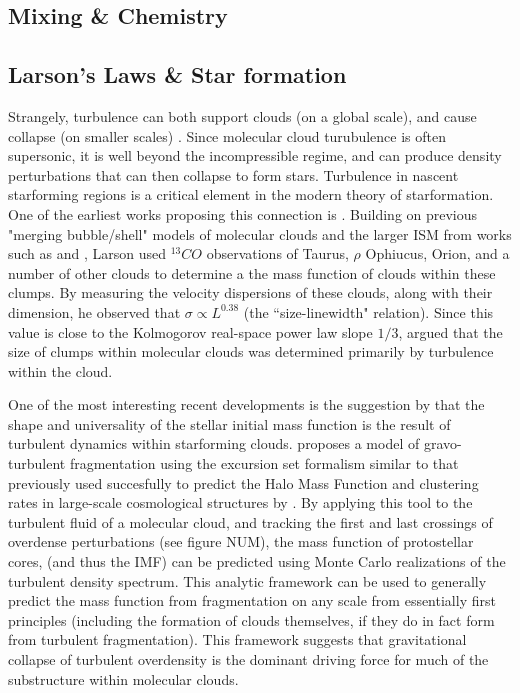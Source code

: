 \documentclass[12pt, preprint]{aastex}
\begin{document}
\subsection{Mixing \& Chemistry}
\subsection{Larson's Laws \& Star formation}
Strangely, turbulence can both support clouds (on a global scale), and cause
collapse (on smaller scales) \citep{mac2004}.  Since molecular cloud
turubulence is often supersonic, it is well beyond the incompressible regime,
and can produce density perturbations that can then collapse to form
stars\citep{elm2004}. Turbulence in nascent starforming 
regions is a critical element in the modern theory 
of starformation. One of the earliest works proposing this connection is
\citet{larson1981}.  Building on previous "merging bubble/shell" models of
molecular clouds and the larger ISM from works such as \citet{norman1980} and
\citet{mckee1977}, Larson used $^{13}CO$ observations of Taurus, $\rho$
Ophiucus, Orion, and a number of other clouds to determine a the mass function
of clouds within these clumps.  By measuring the velocity dispersions of these
clouds, along with their dimension, he observed that $\sigma \propto L^{0.38}$
(the ``size-linewidth" relation).  Since this value is close to the Kolmogorov
real-space power law slope $1/3$, \citet{larson1981} argued that the size of
clumps within molecular clouds was determined primarily by turbulence within
the cloud.

One of the most interesting recent developments is the suggestion by
\citet{hopk2013} that the
shape and universality of the stellar initial mass function is the result of 
turbulent dynamics within
starforming clouds. \citet{hopk2013} proposes a model of gravo-turbulent
fragmentation using the excursion set formalism similar to that previously used 
succesfully to predict the Halo Mass Function and clustering rates in
large-scale cosmological structures by \citet{press1974}.  By applying this tool
to the turbulent fluid of a molecular cloud, and tracking the first and last
crossings of overdense perturbations (see figure NUM), the mass function of
protostellar cores, (and thus the IMF) can be predicted using Monte Carlo
realizations of the turbulent density spectrum.  This analytic framework
can be used to generally predict the mass function from fragmentation
on any scale from essentially first principles (including the formation 
of clouds themselves, if they do in fact
form from turbulent fragmentation).  This framework suggests that gravitational
collapse of turbulent overdensity is the dominant driving force for much of the
substructure within molecular clouds.
\end{document}
